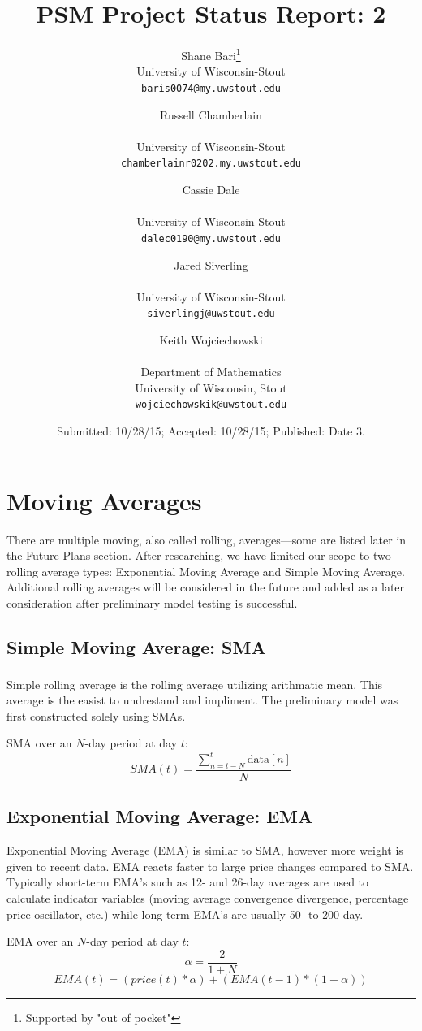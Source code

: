 \documentclass[11pt]{article}
\title{PSM Project Status Report: 2}
\author{
Shane Bari\footnote{Supported by "out of pocket"}\\
\small University of Wisconsin-Stout\\[-0.8ex]
\small \texttt{baris0074@my.uwstout.edu}
\and
Russell Chamberlain\addtocounter{footnote}{0}\footnotemark[\value{footnote}]\\
\small University of Wisconsin-Stout\\[-0.8ex]
\small \texttt{chamberlainr0202.my.uwstout.edu}
\and
Cassie Dale\addtocounter{footnote}{0}\footnotemark[\value{footnote}]\\
\small University of Wisconsin-Stout\\[-0.8ex]
\small \texttt{dalec0190@my.uwstout.edu}
\and
Jared Siverling\addtocounter{footnote}{0}\footnotemark[\value{footnote}]\\
\small University of Wisconsin-Stout\\[-0.8ex]
\small \texttt{siverlingj@uwstout.edu}
\and
Keith Wojciechowski\addtocounter{footnote}{0}\footnotemark[\value{footnote}]\\
\small Department of Mathematics\\[-0.8ex]
\small University of Wisconsin, Stout\\[-0.8ex]
\small \texttt{wojciechowskik@uwstout.edu}
}
\date{\small Submitted: 10/28/15;  Accepted: 10/28/15;  Published: Date 3.}
\begin{document}
\maketitle



\section*{\hspace{-.5cm}Moving Averages}\label{RA}
There are multiple moving, also called rolling, averages---some are listed later in the Future Plans section. After researching, we have limited our scope to two rolling average types: Exponential Moving Average and Simple Moving Average. Additional rolling averages will be considered in the future and added as a later consideration after preliminary model testing is successful.

\subsection*{Simple Moving Average: SMA}\label{SMA}
Simple rolling average is the rolling average utilizing arithmatic mean.\textsuperscript{\cite{INV}} This average is the easist to undrestand and impliment. The preliminary model was first constructed solely using SMAs.

SMA over an $N$-day period at day $t$:
\[
SMA(t) = \frac{\sum_{n=t-N}^{t}\text{data}[n]}{N}
\]

\subsection*{Exponential Moving Average: EMA}\label{EMA}
Exponential Moving Average (EMA) is similar to SMA, however more weight is given to recent data. EMA reacts faster to large price changes compared to SMA. Typically short-term EMA’s such as 12- and 26-day averages are used to calculate indicator variables (moving average convergence divergence, percentage price oscillator, etc.) while long-term EMA’s are usually 50- to 200-day.\cite{INV}
 
EMA over an $N$-day period at day $t$:
\[
\alpha = \frac{2}{1+N}
\]
\[
EMA(t) = (price(t) * \alpha) + (EMA(t-1) * (1-\alpha))
\]
\end{document}
